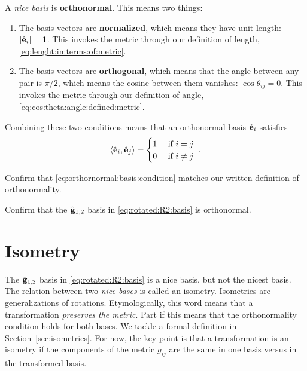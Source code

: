 \documentclass[12pt, oneside]{report}    %
\let\oldsection\section
\def\section{%
  \setcounter{sidenote}{1}%
  \oldsection
}
\begin{document}
A \emph{nice basis} is \textbf{orthonormal}. This means two things:
\begin{enumerate}
    \item The basis vectors are \textbf{normalized}, which means they have unit length: $|\hat{\mathbf{e}}_i| = 1$. This invokes the metric through our definition of length, \eqref{eq:lenght:in:terms:of:metric}. 
    \item The basis vectors are \textbf{orthogonal}, which means that the angle between any pair is $\pi/2$, which means the cosine between them vanishes: $\cos\theta_{ij} = 0$. This invokes the metric through our definition of angle, \eqref{eq:cos:theta:angle:defined:metric}. 
\end{enumerate}
Combining these two conditions means that an orthonormal basis $\hat{\mathbf{e}}_{i}$ satisfies
\begin{align}
  \langle \hat{\mathbf{e}}_i , \hat{\mathbf{e}}_j \rangle
  = 
  \begin{cases}
    1 &\textnormal{ if } i=j \\
    0 &\textnormal{ if } i \neq j  
  \end{cases}   \ .
  \label{eq:orthornormal:basis:condition}
\end{align}
\begin{exercise}
Confirm that \eqref{eq:orthornormal:basis:condition} matches our written definition of orthonormality.
\end{exercise}
\begin{exercise}
Confirm that the $\hat{\mathbf{g}}_{1,2}$ basis in \eqref{eq:rotated:R2:basis} is orthonormal.
\end{exercise}




\section{Isometry}\label{sec:isometry:next:pass:bases}


The $\hat{\mathbf{g}}_{1,2}$ basis in \eqref{eq:rotated:R2:basis} is a nice basis, but not the nicest basis. The relation between two \emph{nice bases} is called an isometry. Isometries are generalizations of rotations. Etymologically, this word means that a  transformation \emph{preserves the metric}. Part if this means that the orthonormality condition holds for both bases. We tackle a formal definition in Section~\ref{sec:isometries}. For now, the key point is that a transformation is an isometry if the components of the metric $g_{ij}$ are the same in one basis versus in the transformed basis.
\end{document}
